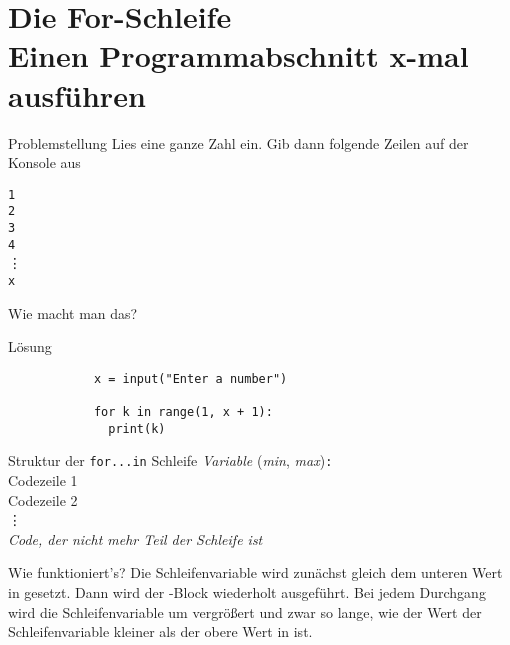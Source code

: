 \section{Die For-Schleife \\ \footnotesize Einen Programmabschnitt x-mal ausführen}

\begin{frame}

\begin{block}{Problemstellung}
\vspace{2pt}
Lies eine ganze Zahl  ein. Gib dann folgende Zeilen auf der Konsole aus 

\texttt{1}\\
\texttt{2}\\
\texttt{3}\\
\texttt{4}\\
\vdots \\
\texttt{x}

\vspace{12pt}
Wie macht man das? 

\end{block}
\end{frame}

\begin{fragile}{}
	\begin{block}{Lösung}
		\begin{verbatim}
			x = input("Enter a number")
			
			for k in range(1, x + 1):	
			  print(k)
		\end{verbatim}
	\end{block}
\end{fragile}

\begin{frame}

	\renewcommand{\baselinestretch}{1.5}
	\begin{block}{Struktur der \texttt{for...in} Schleife}
		\vspace{2pt}
		\pause {} \pause \textit{Variable} \pause {} \pause {}(\textit{min}, \textit{max})\pause\texttt{:} \pause \\
		\spacechar\spacechar Codezeile 1 \pause \\ 
\spacechar\spacechar Codezeile 2 \pause \\
\spacechar\spacechar \phantom{Code} \vdots \pause  \\
\textit{Code, der nicht mehr Teil der Schleife ist}
	\end{block}

\vspace{12pt}
\pause 

	\renewcommand{\baselinestretch}{1}
	\begin{block}{Wie funktioniert's?}
		\vspace{2pt}
	Die Schleifenvariable wird zunächst gleich dem unteren Wert in  gesetzt. Dann wird der -Block wiederholt ausgeführt. Bei jedem Durchgang wird die Schleifenvariable um  vergrößert und zwar so lange, wie der Wert der Schleifenvariable kleiner als der obere Wert in  ist. 	
	\end{block}
\end{frame}

